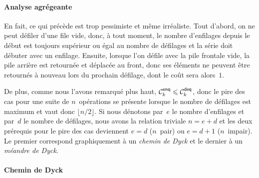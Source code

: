 \paragraph{Analyse agrégeante}

En fait, ce qui précède est trop pessimiste et même irréaliste. Tout
d'abord, on ne peut défiler d'une file vide, donc, à tout moment, le
nombre d'enfilages depuis le début est toujours supérieur ou égal au
nombre de défilages et la série doit débuter avec un
enfilage. Ensuite, lorsque l'on défile avec la pile frontale vide, la
pile arrière est retournée et déplacée au front, donc ses éléments ne
peuvent être retournés à nouveau lors du prochain défilage, dont le
coût sera alors~\(1\).

De plus, comme nous l'avons remarqué plus haut, \(\C{\fun{enq}}{k}
\leqslant \C{\fun{deq}}{k}\), donc le pire des cas pour une suite de
\(n\)~opérations se présente lorsque le nombre de défilages est
maximum et vaut donc \(\lfloor{n/2}\rfloor\). Si nous dénotons
par~\(e\) le nombre d'enfilages et par~\(d\) le nombre de défilages,
nous avons la relation triviale \(n = e + d\) et les deux prérequis
pour le pire des cas deviennent \(e=d\) (\(n\)~pair) ou \(e=d+1\)
(\(n\)~impair). Le premier correspond graphiquement à un \emph{chemin
de Dyck} et le dernier à un \emph{méandre de
Dyck}.

\paragraph{Chemin de Dyck}

